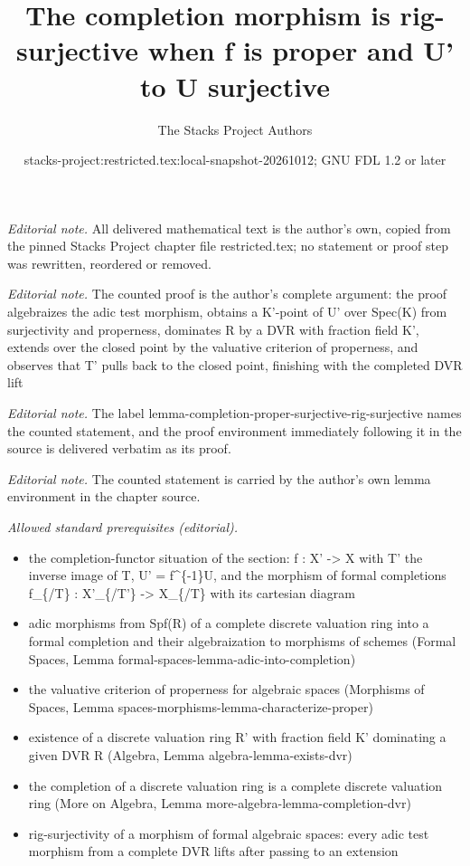 \documentclass[10pt,a4paper]{amsart}
\title{The completion morphism is rig-surjective when f is proper and U' to U surjective}
\author{The Stacks Project Authors}
\date{stacks-project:restricted.tex:local-snapshot-20261012; GNU FDL 1.2 or later}
\theoremstyle{plain}
\theoremstyle{definition}
\theoremstyle{remark}
\numberwithin{equation}{subsection}
\begin{document}
\maketitle
\noindent\textit{Editorial note.} All delivered mathematical text is the author's own, copied from the pinned Stacks Project chapter file restricted.tex; no statement or proof step was rewritten, reordered or removed.\par\medskip
\noindent\textit{Editorial note.} The counted proof is the author's complete argument: the proof algebraizes the adic test morphism, obtains a K'-point of U' over Spec(K) from surjectivity and properness, dominates R by a DVR with fraction field K', extends over the closed point by the valuative criterion of properness, and observes that T' pulls back to the closed point, finishing with the completed DVR lift\par\medskip
\noindent\textit{Editorial note.} The label lemma-completion-proper-surjective-rig-surjective names the counted statement, and the proof environment immediately following it in the source is delivered verbatim as its proof.\par\medskip
\noindent\textit{Editorial note.} The counted statement is carried by the author's own lemma environment in the chapter source.\par\medskip
\noindent\textit{Allowed standard prerequisites (editorial).}\begin{itemize}
\item the completion-functor situation of the section: f : X' -> X with T' the inverse image of T, U' = f\textasciicircum{}\{-1\}U, and the morphism of formal completions f\_\{/T\} : X'\_\{/T'\} -> X\_\{/T\} with its cartesian diagram
\item adic morphisms from Spf(R) of a complete discrete valuation ring into a formal completion and their algebraization to morphisms of schemes (Formal Spaces, Lemma formal-spaces-lemma-adic-into-completion)
\item the valuative criterion of properness for algebraic spaces (Morphisms of Spaces, Lemma spaces-morphisms-lemma-characterize-proper)
\item existence of a discrete valuation ring R' with fraction field K' dominating a given DVR R (Algebra, Lemma algebra-lemma-exists-dvr)
\item the completion of a discrete valuation ring is a complete discrete valuation ring (More on Algebra, Lemma more-algebra-lemma-completion-dvr)
\item rig-surjectivity of a morphism of formal algebraic spaces: every adic test morphism from a complete DVR lifts after passing to an extension
\end{itemize}\medskip
\end{document}
